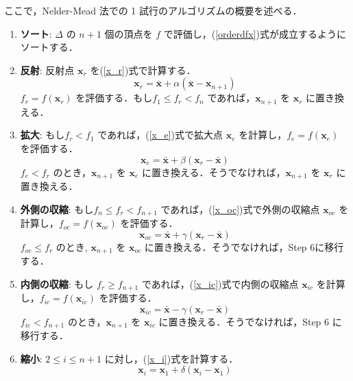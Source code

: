 \documentclass[twocolumn]{jarticle}
\begin{document}
    ここで，Nelder-Mead 法での 1 試行のアルゴリズムの概要を述べる．
    \begin{enumerate}[Step 1]
        \item \textbf{ソート}: $\Delta$ の $n+1$ 個の頂点を $f$ で評価し，(\ref{orderdfx})式が成立するようにソートする．
        \item \textbf{反射}: 反射点 $\bm{x}_r$ を(\ref{x_r})式で計算する．
        \begin{equation}
            \label{x_r}
            \bm{x}_r = \bar{\bm{x}} + \alpha(\bar{\bm{x}} - \bm{x}_{n+1})
        \end{equation}
        $f_r = f(\bm{x}_r)$ を評価する．もし$f_1 \leq f_r < f_n$ であれば，$\bm{x}_{n+1}$ を $\bm{x}_r$ に置き換える．
        \item \textbf{拡大}: もし$f_r < f_1$ であれば，(\ref{x_e})式で拡大点 $\bm{x}_e$ を計算し，$f_e = f(\bm{x}_e)$ を評価する．
        \begin{equation}
            \label{x_e}
            \bm{x}_e = \bar{\bm{x}} + \beta(\bm{x}_r - \bar{\bm{x}})
        \end{equation}
        $f_e < f_r$ のとき，$\bm{x}_{n+1}$ を $\bm{x}_e$ に置き換える．そうでなければ，$\bm{x}_{n+1}$ を $\bm{x}_r$ に置き換える．
        \item \textbf{外側の収縮}: もし$f_n \leq f_r < f_{n+1}$ であれば，(\ref{x_oc})式で外側の収縮点 $\bm{x}_{oc}$ を計算し，$f_{oc} = f(\bm{x}_{oc})$ を評価する．
        \begin{equation}
            \label{x_oc}
            \bm{x}_{oc} = \bar{\bm{x}} + \gamma(\bm{x}_r - \bar{\bm{x}})
        \end{equation}
        $f_{oc} \leq f_r$ のとき, $\bm{x}_{n+1}$ を $\bm{x}_{oc}$ に置き換える．そうでなければ，Step 6に移行する．
        \item \textbf{内側の収縮}: もし $f_r \geq f_{n+1}$ であれば，(\ref{x_ic})式で内側の収縮点 $\bm{x}_{ic}$ を計算し，$f_{ic} = f(\bm{x}_{ic})$ を評価する．
        \begin{equation}
            \label{x_ic}
            \bm{x}_{ic} = \bar{\bm{x}} - \gamma(\bm{x}_r - \bar{\bm{x}})
        \end{equation}
        $f_{ic} < f_{n+1}$ のとき，$\bm{x}_{n+1}$ を $\bm{x}_{ic}$ に置き換える．そうでなければ，Step 6 に移行する．
        \item \textbf{縮小}: $2 \leq i \leq n+1$ に対し，(\ref{x_i})式を計算する．
        \begin{equation}
            \label{x_i}
            \bm{x}_i = \bm{x}_1 + \delta(\bm{x}_i - \bm{x}_1)
        \end{equation}
    \end{enumerate}
\end{document}
